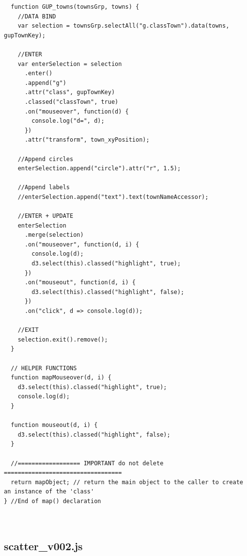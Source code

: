 \documentclass[a4paper, 11pt]{article}
\begin{document}
\begin{verbatim}
  function GUP_towns(townsGrp, towns) {
    //DATA BIND
    var selection = townsGrp.selectAll("g.classTown").data(towns, gupTownKey);

    //ENTER
    var enterSelection = selection
      .enter()
      .append("g")
      .attr("class", gupTownKey)
      .classed("classTown", true)
      .on("mouseover", function(d) {
        console.log("d=", d);
      })
      .attr("transform", town_xyPosition);

    //Append circles
    enterSelection.append("circle").attr("r", 1.5);

    //Append labels
    //enterSelection.append("text").text(townNameAccessor);

    //ENTER + UPDATE
    enterSelection
      .merge(selection)
      .on("mouseover", function(d, i) {
        console.log(d);
        d3.select(this).classed("highlight", true);
      })
      .on("mouseout", function(d, i) {
        d3.select(this).classed("highlight", false);
      })
      .on("click", d => console.log(d));

    //EXIT
    selection.exit().remove();
  }

  // HELPER FUNCTIONS
  function mapMouseover(d, i) {
    d3.select(this).classed("highlight", true);
    console.log(d);
  }

  function mouseout(d, i) {
    d3.select(this).classed("highlight", false);
  }

  //================== IMPORTANT do not delete ==================================
  return mapObject; // return the main object to the caller to create an instance of the 'class'
} //End of map() declaration

    
\end{verbatim}




\subsection{scatter\_v002.js}
\end{document}

